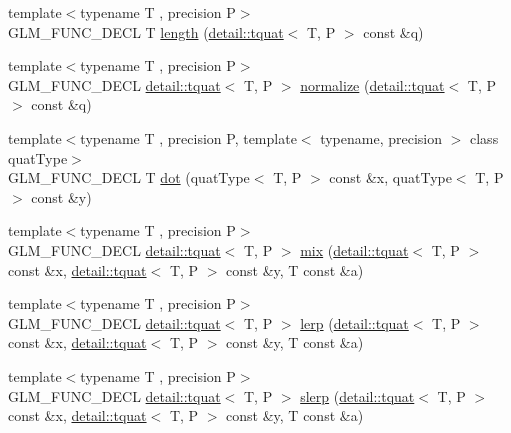 \begin{DoxyCompactItemize}
\item 
{\footnotesize template$<$typename T , precision P$>$ }\\G\-L\-M\-\_\-\-F\-U\-N\-C\-\_\-\-D\-E\-C\-L T \hyperlink{group__gtc__quaternion_ga3406ab83e2cafd4034f359957e942410}{length} (\hyperlink{structglm_1_1detail_1_1tquat}{detail\-::tquat}$<$ T, P $>$ const \&q)
\item 
{\footnotesize template$<$typename T , precision P$>$ }\\G\-L\-M\-\_\-\-F\-U\-N\-C\-\_\-\-D\-E\-C\-L \hyperlink{structglm_1_1detail_1_1tquat}{detail\-::tquat}$<$ T, P $>$ \hyperlink{group__gtc__quaternion_ga34ee289ca53a08207904e935104715d8}{normalize} (\hyperlink{structglm_1_1detail_1_1tquat}{detail\-::tquat}$<$ T, P $>$ const \&q)
\item 
{\footnotesize template$<$typename T , precision P, template$<$ typename, precision $>$ class quat\-Type$>$ }\\G\-L\-M\-\_\-\-F\-U\-N\-C\-\_\-\-D\-E\-C\-L T \hyperlink{group__gtc__quaternion_gac54dfc83de465a2d03e90d342242ab3d}{dot} (quat\-Type$<$ T, P $>$ const \&x, quat\-Type$<$ T, P $>$ const \&y)
\item 
{\footnotesize template$<$typename T , precision P$>$ }\\G\-L\-M\-\_\-\-F\-U\-N\-C\-\_\-\-D\-E\-C\-L \hyperlink{structglm_1_1detail_1_1tquat}{detail\-::tquat}$<$ T, P $>$ \hyperlink{group__gtc__quaternion_gafabf175ae3e2cd30bf58dc313321955a}{mix} (\hyperlink{structglm_1_1detail_1_1tquat}{detail\-::tquat}$<$ T, P $>$ const \&x, \hyperlink{structglm_1_1detail_1_1tquat}{detail\-::tquat}$<$ T, P $>$ const \&y, T const \&a)
\item 
{\footnotesize template$<$typename T , precision P$>$ }\\G\-L\-M\-\_\-\-F\-U\-N\-C\-\_\-\-D\-E\-C\-L \hyperlink{structglm_1_1detail_1_1tquat}{detail\-::tquat}$<$ T, P $>$ \hyperlink{group__gtc__quaternion_gafc1c989eaa2c786d34218b176f680fe0}{lerp} (\hyperlink{structglm_1_1detail_1_1tquat}{detail\-::tquat}$<$ T, P $>$ const \&x, \hyperlink{structglm_1_1detail_1_1tquat}{detail\-::tquat}$<$ T, P $>$ const \&y, T const \&a)
\item 
{\footnotesize template$<$typename T , precision P$>$ }\\G\-L\-M\-\_\-\-F\-U\-N\-C\-\_\-\-D\-E\-C\-L \hyperlink{structglm_1_1detail_1_1tquat}{detail\-::tquat}$<$ T, P $>$ \hyperlink{group__gtc__quaternion_ga7468a211a20ea56ea5cfb0625226868a}{slerp} (\hyperlink{structglm_1_1detail_1_1tquat}{detail\-::tquat}$<$ T, P $>$ const \&x, \hyperlink{structglm_1_1detail_1_1tquat}{detail\-::tquat}$<$ T, P $>$ const \&y, T const \&a)

\end{DoxyCompactItemize}
